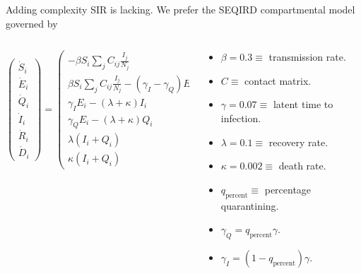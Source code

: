 \documentclass[aspectratio=169]{beamer}
\begin{document}
\begin{frame}{Adding complexity}
\vfill
SIR is lacking.  We prefer the SEQIRD compartmental model governed by
\begin{columns}
\begin{column}{0.5\textwidth}
\[
\begin{pmatrix} \dot{S}_i \\ \dot{E}_i \\ \dot{Q}_i \\ \dot{I}_i \\ \dot{R}_i \\ \dot{D}_i \end{pmatrix} = \begin{pmatrix} -\beta S_i \sum_j C_{ij} \frac{I_j}{N_j} \\ \beta S_i \sum_j C_{ij} \frac{I_j}{N_j} - (\gamma_I - \gamma_Q)E_i \\ \gamma_I E_i - (\lambda + \kappa)I_i \\ \gamma_Q E_i - (\lambda + \kappa) Q_i \\ \lambda(I_i + Q_i) \\ \kappa (I_i + Q_i) \end{pmatrix}
\]
\end{column}
\begin{column}{0.5\textwidth}
    \begin{itemize}
        \item $\beta = 0.3 \equiv $ transmission rate.
        \item $C \equiv $ contact matrix.
        \item $\gamma = 0.07 \equiv $ latent time to infection.
        \item $\lambda = 0.1 \equiv $ recovery rate.
        \item $\kappa = 0.002 \equiv $ death rate.
        \item $q_{\textrm{percent}} \equiv $ percentage quarantining.
        \item $\gamma_Q = q_{\textrm{percent}} \gamma$.
        \item $\gamma_I = (1-q_{\textrm{percent}}) \gamma$.
    \end{itemize}
\end{column}
\end{columns}
\vfill
\end{frame}
\end{document}
